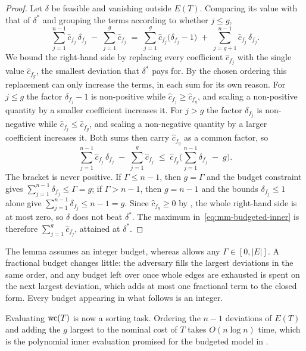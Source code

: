 \begin{proof}
Let $\delta$ be feasible and vanishing outside $E(T)$.
Comparing its value with that of $\delta^{*}$ and grouping the terms according to whether $j \leq g$,
\[
\sum_{j=1}^{n-1} \hat{c}_{f_j}\, \delta_{f_j} \;-\; \sum_{j=1}^{g} \hat{c}_{f_j}
\;=\;
\sum_{j=1}^{g} \hat{c}_{f_j} \bigl( \delta_{f_j} - 1 \bigr)
\;+\;
\sum_{j = g+1}^{n-1} \hat{c}_{f_j}\, \delta_{f_j}.
\]
We bound the right-hand side by replacing every coefficient $\hat{c}_{f_j}$ with the single value $\hat{c}_{f_g}$, the smallest deviation that $\delta^{*}$ pays for.
By the chosen ordering this replacement can only increase the terms, in each sum for its own reason.
For $j \leq g$ the factor $\delta_{f_j} - 1$ is non-positive while $\hat{c}_{f_j} \geq \hat{c}_{f_g}$, and scaling a non-positive quantity by a smaller coefficient increases it.
For $j > g$ the factor $\delta_{f_j}$ is non-negative while $\hat{c}_{f_j} \leq \hat{c}_{f_g}$, and scaling a non-negative quantity by a larger coefficient increases it.
Both sums then carry $\hat{c}_{f_g}$ as a common factor, so
\[
\sum_{j=1}^{n-1} \hat{c}_{f_j}\, \delta_{f_j} \;-\; \sum_{j=1}^{g} \hat{c}_{f_j}
\;\leq\;
\hat{c}_{f_g} \Biggl( \sum_{j=1}^{n-1} \delta_{f_j} \;-\; g \Biggr).
\]
The bracket is never positive.
If $\Gamma \leq n-1$, then $g = \Gamma$ and the budget constraint gives $\sum_{j=1}^{n-1} \delta_{f_j} \leq \Gamma = g$; if $\Gamma > n-1$, then $g = n-1$ and the bounds $\delta_{f_j} \leq 1$ alone give $\sum_{j=1}^{n-1} \delta_{f_j} \leq n-1 = g$.
Since $\hat{c}_{f_g} \geq 0$ by , the whole right-hand side is at most zero, so $\delta$ does not beat $\delta^{*}$.
The maximum in~\eqref{eq:mm-budgeted-inner} is therefore $\sum_{j=1}^{g} \hat{c}_{f_j}$, attained at $\delta^{*}$.
\end{proof}

The lemma assumes an integer budget, whereas  allows any $\Gamma \in [0, |E|]$.
A fractional budget changes little: the adversary fills the largest deviations in the same order, and any budget left over once whole edges are exhausted is spent on the next largest deviation, which adds at most one fractional term to the closed form.
Every budget appearing in what follows is an integer.

Evaluating $\mathrm{wc}(T)$ is now a sorting task.
Ordering the $n-1$ deviations of $E(T)$ and adding the $g$ largest to the nominal cost of $T$ takes $O(n \log n)$ time, which is the polynomial inner evaluation promised for the budgeted model in .

